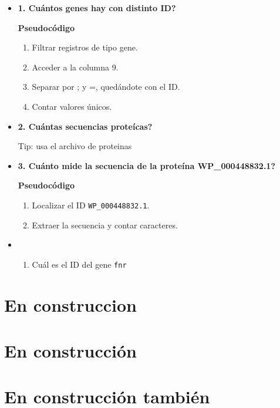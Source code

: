\documentclass[
]{book}
\providecommand{\tightlist}{%
  \setlength{\itemsep}{0pt}\setlength{\parskip}{0pt}}
\begin{document}
\begin{itemize}
\item
  \textbf{1. Cuántos genes hay con distinto ID?}

  \textbf{Pseudocódigo}

  \begin{enumerate}
  \def\labelenumi{\arabic{enumi}.}
  \item
    Filtrar registros de tipo gene.
  \item
    Acceder a la columna 9.
  \item
    Separar por ; y =, quedándote con el ID.
  \item
    Contar valores únicos.
  \end{enumerate}
\item
  \textbf{2. Cuántas secuencias proteícas?}

  Tip: usa el archivo de proteinas
\item
  \textbf{3. Cuánto mide la secuencia de la proteína WP\_000448832.1?}

  \textbf{Pseudocódigo}

  \begin{enumerate}
  \def\labelenumi{\arabic{enumi}.}
  \item
    Localizar el ID \texttt{WP\_000448832.1}.
  \item
    Extraer la secuencia y contar caracteres.
  \end{enumerate}
\item
  \begin{enumerate}
  \def\labelenumi{\arabic{enumi}.}
  \setcounter{enumi}{3}
  \tightlist
  \item
    Cuál es el ID del gene \texttt{fnr}
  \end{enumerate}
\end{itemize}

\chapter{En construccion}\label{en-construccion}

\chapter{En construcción}\label{en-construcciuxf3n}

\chapter{En construcción también}\label{en-construcciuxf3n-tambiuxe9n}
\end{document}
